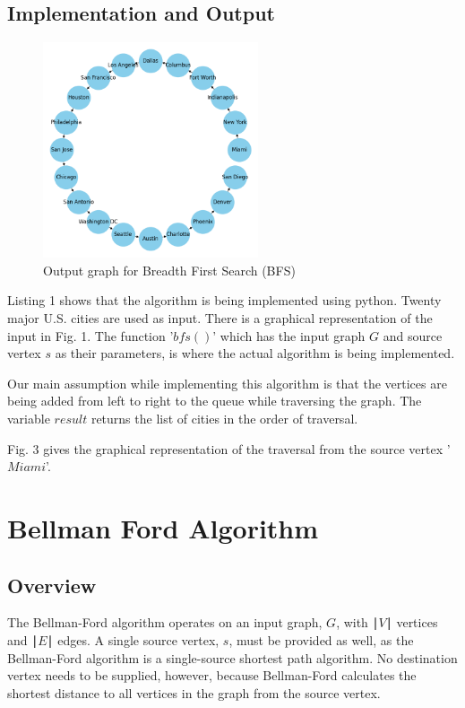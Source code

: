 \documentclass[lettersize,journal]{IEEEtran}
\begin{document}
\subsection{Implementation and Output}

\begin{figure}[!t]
\centering
\includegraphics[width=2.5in]{bfs_output.png}
\caption{Output graph for Breadth First Search (BFS)}
\label{fig_3}
\end{figure}

Listing 1 shows that the algorithm is being implemented using python. Twenty major U.S. cities are used as input. There is a graphical representation of the input in Fig. 1. The function '\(bfs()\)' which has the input graph \(G\) and source vertex \(s\) as their parameters, is where the actual algorithm is being implemented. 

Our main assumption while implementing this algorithm is that the vertices are being added from left to right to the queue while traversing the graph. The variable \(result\) returns the list of cities in the order of traversal.

Fig. 3 gives the graphical representation of the traversal from the source vertex '\(Miami\)'.




\section{Bellman Ford Algorithm}

\subsection{Overview}

The Bellman-Ford algorithm operates on an input graph, \(G\), with ∣\(V\)∣ vertices and ∣\(E\)∣ edges. A single source vertex, \(s\), must be provided as well, as the Bellman-Ford algorithm is a single-source shortest path algorithm. No destination vertex needs to be supplied, however, because Bellman-Ford calculates the shortest distance to all vertices in the graph from the source vertex.
\end{document}
